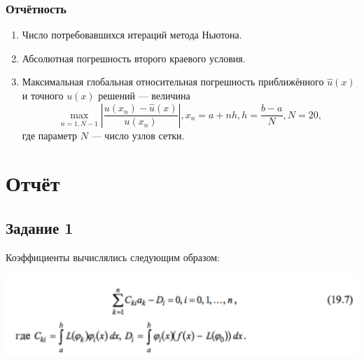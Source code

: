 \documentclass[oneside, final, 12pt]{article}
\begin{document}
\subsubsection{Отчётность}
\begin{enumerate}
    \item Число потребовавшихся итераций метода Ньютона.
    \item Абсолютная погрешность второго краевого условия.
    \item Максимальная глобальная относительная погрешность приближённого $\hat{u} (x)$ и точного $u(x)$  решений — величина \begin{equation*}
        \max\limits_{n = \overline{1, N-1}} \left| \dfrac{u(x_n) - \hat{u}(x)}{u(x_n)} \right|, x_n = a + n h, h = \dfrac{b - a}{N}, N = 20,
    \end{equation*}
    где параметр $N$ — число узлов сетки.
\end{enumerate}

\section{Отчёт}

\subsection{Задание 1}
Коэффициенты вычислялись следующим образом:

\includegraphics[scale=0.4]{formula1.png}
\end{document}
